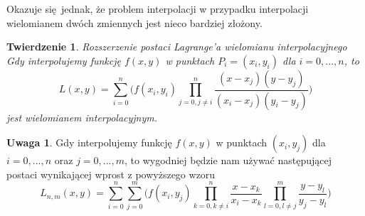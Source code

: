 \documentclass[10pt,wide]{mwart}
\newtheorem{tw}{Twierdzenie}
\theoremstyle{definition}
\newtheorem{uw}{Uwaga}
\begin{document}
Okazuje się jednak, że problem interpolacji w przypadku interpolacji wielomianem dwóch zmiennych jest nieco bardziej złożony.

\begin{tw}{Rozszerzenie postaci Lagrange'a wielomianu interpolacyjnego} \\
  Gdy interpolujemy funkcję \(f(x,y)\) w punktach \(P_i = (x_i,y_i)\) dla \( i = 0,...,n \), to
 \begin{equation*}
   L(x,y) = \sum_{i=0}^{n}\Big(f(x_i,y_i)\prod_{j = 0, j\neq i}^{n}\frac{(x-x_j)(y-y_j)}{(x_i - x_j)(y_i - y_j)}\Big)
 \end{equation*}
 jest wielomianem interpolacyjnym.
\end{tw}
\begin{uw}
  Gdy interpolujemy funkcję \(f(x,y)\) w punktach \((x_i, y_j)\) dla \( i = 0,...,n\) oraz \(j = 0,...,m\), to
  wygodniej będzie nam używać następującej postaci wynikającej wprost z powyższego wzoru
  \begin{equation*}
    L_{n,m}(x,y) = \sum_{i=0}^{n}\sum_{j=0}^m\Big(f(x_i,y_j)\prod_{k = 0, k\neq i}^{n}\frac{x-x_k}{x_i - x_k} \prod_{l=0, l \neq j}^{m}\frac{y-y_l}{y_j - y_l}\Big)
  \end{equation*}
\end{uw}
\end{document}
